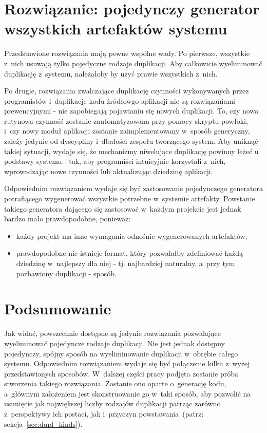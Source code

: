 \section{Rozwiązanie: pojedynczy generator wszystkich artefaktów systemu} \label{sec:single_generator}

Przedstawione rozwiązania mają pewne wspólne wady.
Po pierwsze, wszystkie z~nich usuwają tylko pojedyczne rodzaje duplikacji.
Aby całkowicie wyeliminować duplikację z~systemu, należałoby by użyć prawie wszystkich z~nich.

Po drugie, rozwiązania zwalczające duplikację czynności wykonywanych przez programistów i~duplikacje kodu źródłowgo aplikacji nie są rozwiązaniami prewencyjnymi - nie zapobiegają pojawianiu się nowych duplikacji.
To, czy nowa rutynowa czynność zostanie zautomatyzowana przy pomocy skryptu powłoki, i~czy nowy moduł aplikacji zostanie zaimplementowany w~sposób generyczny, zależy jedynie od dyscypliny i~dbałości zespołu tworzącego system.
Aby uniknąć takiej sytuacji, wydaje się, że mechanizmy niwelujące duplikację powinny leżeć u podstawy systemu - tak, aby programiści intuicyjnie korzystali z~nich, wprowadzając nowe czynności lub aktualizując dziedzinę aplikacji.

Odpowiednim rozwiązaniem wydaje się być zastosowanie pojedynczego generatora potrafiącego wygenerować wszystkie potrzebne w~systemie artefakty.
Powstanie takiego generatora dającego się zastosować w~każdym projekcie jest jednak bardzo mało prawdopodobne, ponieważ:

\begin{itemize}
 \item każdy projekt ma inne wymagania odnośnie wygenerowanych artefaktów;
 \item prawdopodobne nie istnieje format, który pozwalałby zdefiniować każdą dziedzinę w~najlepszy dla niej - tj. najbardziej naturalny, a~przy tym pozbawiony duplikacji - sposób.
\end{itemize}



\section{Podsumowanie}

Jak widać, powszechnie dostępne są jedynie rozwiązania pozwalające wyeliminować pojedyncze rodzaje duplikacji.
Nie jest jednak dostępny pojedynczy, spójny sposób na wyeliminowanie duplikacji w~obrębie całego systemu.
Odpowiednim rozwiązaniem wydaje się być połączenie kilku z~wyżej przedstawionych sposobów.
W~dalszej części pracy podjęta zostanie próba stworzenia takiego rozwiązania.
Zostanie ono oparte o~generację kodu, a~głównym założeniem jest skonstruowanie go w~taki sposób, aby pozwolić na usunięcie jak największej liczby rodzajów duplikacji patrząc zarówno z~perspektywy ich postaci, jak i~przyczyn powstawania~(patrz: sekcja~\ref{sec:dupl_kinds}).

